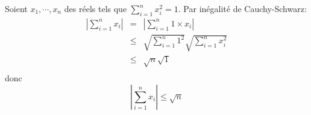 Soient $x_1,\cdots,x_n$ des réels tels que $\sum_{i=1}^n{x^2_i}=1$. Par inégalité de Cauchy-Schwarz:
\begin{eqnarray*}
  \left| \sum_{i=1}^n{x_i} \right| &=& \left| \sum_{i=1}^n{1\times x_i} \right| \\
    &\leq&  \sqrt{\sum_{i=1}^n{1^2} } \sqrt{\sum_{i=1}^n{ x^2_i} } \\
    &\leq&  \sqrt{n} \sqrt{1} \\
\end{eqnarray*}
donc
\[
\left| \sum_{i=1}^n{x_i} \right| \leq  \sqrt{n}
\]
